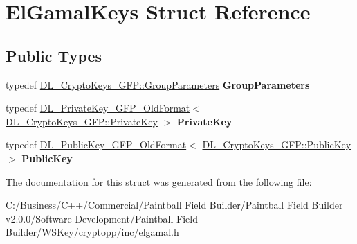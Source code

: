 \hypertarget{struct_el_gamal_keys}{
\section{ElGamalKeys Struct Reference}
\label{struct_el_gamal_keys}
}
\subsection*{Public Types}
\begin{DoxyCompactItemize}
\item 
\hypertarget{struct_el_gamal_keys_ae10059fce15b21179676ab2db8bd227d}{
typedef \hyperlink{class_d_l___group_parameters___g_f_p___default_safe_prime}{DL\_\-CryptoKeys\_\-GFP::GroupParameters} {\bfseries GroupParameters}}
\label{struct_el_gamal_keys_ae10059fce15b21179676ab2db8bd227d}

\item 
\hypertarget{struct_el_gamal_keys_aff410f83d6ac24b4afd96943114ce7a1}{
typedef \hyperlink{class_d_l___private_key___g_f_p___old_format}{DL\_\-PrivateKey\_\-GFP\_\-OldFormat}$<$ \hyperlink{class_d_l___private_key___g_f_p}{DL\_\-CryptoKeys\_\-GFP::PrivateKey} $>$ {\bfseries PrivateKey}}
\label{struct_el_gamal_keys_aff410f83d6ac24b4afd96943114ce7a1}

\item 
\hypertarget{struct_el_gamal_keys_a82a0f8186c0a2ca37c7db9f3e6923256}{
typedef \hyperlink{class_d_l___public_key___g_f_p___old_format}{DL\_\-PublicKey\_\-GFP\_\-OldFormat}$<$ \hyperlink{class_d_l___public_key___g_f_p}{DL\_\-CryptoKeys\_\-GFP::PublicKey} $>$ {\bfseries PublicKey}}
\label{struct_el_gamal_keys_a82a0f8186c0a2ca37c7db9f3e6923256}

\end{DoxyCompactItemize}


The documentation for this struct was generated from the following file:\begin{DoxyCompactItemize}
\item 
C:/Business/C++/Commercial/Paintball Field Builder/Paintball Field Builder v2.0.0/Software Development/Paintball Field Builder/WSKey/cryptopp/inc/elgamal.h\end{DoxyCompactItemize}
